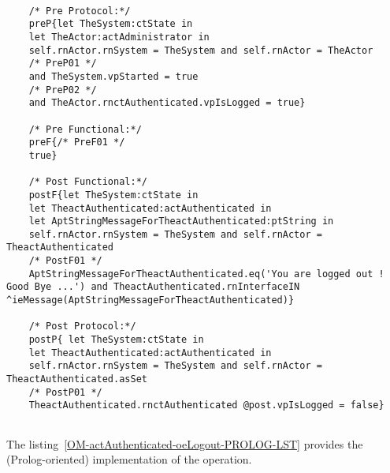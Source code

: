 	\scriptsize
	\vspace{0.5cm}
	\begin{lstlisting}[style=MessirStyle,firstnumber=auto,captionpos=b,caption={\msrmessir (MCL-oriented) specification of the operation \emph{oeLogout}.},label=OM-actAuthenticated-oeLogout-MCL-LST]

	/* Pre Protocol:*/ 
	preP{let TheSystem:ctState in
	let TheActor:actAdministrator in
	self.rnActor.rnSystem = TheSystem and self.rnActor = TheActor
	/* PreP01 */
	and TheSystem.vpStarted = true
	/* PreP02 */
	and TheActor.rnctAuthenticated.vpIsLogged = true}
	
	/* Pre Functional:*/
	preF{/* PreF01 */
	true}
	
	/* Post Functional:*/ 
	postF{let TheSystem:ctState in
	let TheactAuthenticated:actAuthenticated in
	let AptStringMessageForTheactAuthenticated:ptString in
	self.rnActor.rnSystem = TheSystem and self.rnActor = TheactAuthenticated
	/* PostF01 */
	AptStringMessageForTheactAuthenticated.eq('You are logged out ! Good Bye ...') and TheactAuthenticated.rnInterfaceIN ^ieMessage(AptStringMessageForTheactAuthenticated)}
	
	/* Post Protocol:*/ 
	postP{ let TheSystem:ctState in
	let TheactAuthenticated:actAuthenticated in
	self.rnActor.rnSystem = TheSystem and self.rnActor = TheactAuthenticated.asSet
	/* PostP01 */
	TheactAuthenticated.rnctAuthenticated @post.vpIsLogged = false}
	
	\end{lstlisting}
	\normalsize 
	
	
	
	
	
	\vspace{1cm}
	The listing~\ref{OM-actAuthenticated-oeLogout-PROLOG-LST} provides the \msrmessir (Prolog-oriented) implementation of the operation.
	
	\scriptsize
	\vspace{0.5cm}
	
	
	\normalsize





